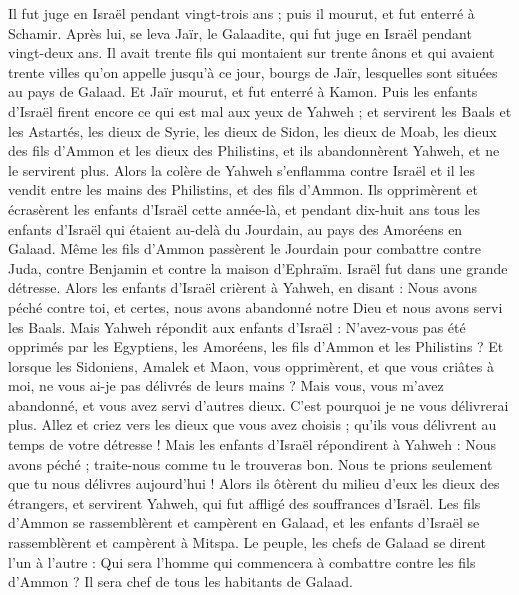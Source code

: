 \begin{multicols}{2}
Il fut juge en Israël pendant vingt-trois ans ; puis il mourut, et fut enterré à Schamir.
Après lui, se leva Jaïr, le Galaadite, qui fut juge en Israël pendant vingt-deux ans.
Il avait trente fils qui montaient sur trente ânons et qui avaient trente villes qu'on appelle jusqu'à ce jour, bourgs de Jaïr, lesquelles sont situées au pays de Galaad.
Et Jaïr mourut, et fut enterré à Kamon.
Puis les enfants d'Israël firent encore ce qui est mal aux yeux de Yahweh ; et servirent les Baals et les Astartés, les dieux de Syrie, les dieux de Sidon, les dieux de Moab, les dieux des fils d'Ammon et les dieux des Philistins, et ils abandonnèrent Yahweh, et ne le servirent plus.
Alors la colère de Yahweh s'enflamma contre Israël et il les vendit entre les mains des Philistins, et des fils d'Ammon.
Ils opprimèrent et écrasèrent les enfants d'Israël cette année-là, et pendant dix-huit ans tous les enfants d'Israël qui étaient au-delà du Jourdain, au pays des Amoréens en Galaad.
Même les fils d'Ammon passèrent le Jourdain pour combattre contre Juda, contre Benjamin et contre la maison d'Ephraïm. Israël fut dans une grande détresse.
Alors les enfants d'Israël crièrent à Yahweh, en disant : Nous avons péché contre toi, et certes, nous avons abandonné notre Dieu et nous avons servi les Baals.
Mais Yahweh répondit aux enfants d'Israël : N'avez-vous pas été opprimés par les Egyptiens, les Amoréens, les fils d'Ammon et les Philistins ?
Et lorsque les Sidoniens, Amalek et Maon, vous opprimèrent, et que vous criâtes à moi, ne vous ai-je pas délivrés de leurs mains ?
Mais vous, vous m'avez abandonné, et vous avez servi d'autres dieux. C'est pourquoi je ne vous délivrerai plus.
Allez et criez vers les dieux que vous avez choisis ; qu'ils vous délivrent au temps de votre détresse !
Mais les enfants d'Israël répondirent à Yahweh : Nous avons péché ; traite-nous comme tu le trouveras bon. Nous te prions seulement que tu nous délivres aujourd'hui !
Alors ils ôtèrent du milieu d'eux les dieux des étrangers, et servirent Yahweh, qui fut affligé des souffrances d'Israël.
Les fils d'Ammon se rassemblèrent et campèrent en Galaad, et les enfants d'Israël se rassemblèrent et campèrent à Mitspa.
Le peuple, les chefs de Galaad se dirent l'un à l'autre : Qui sera l'homme qui commencera à combattre contre les fils d'Ammon ? Il sera chef de tous les habitants de Galaad.

\end{multicols}
